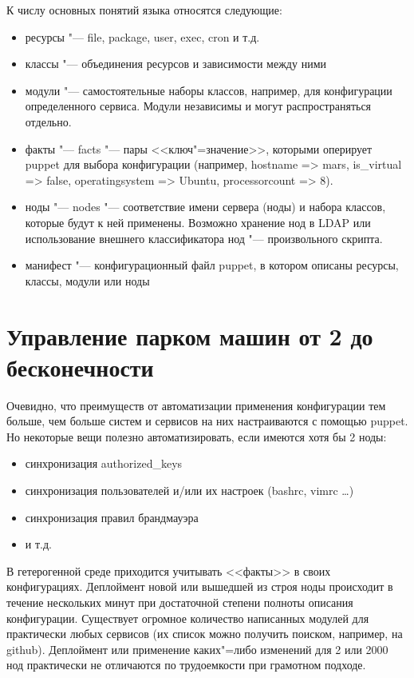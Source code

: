 \documentclass[10pt, a5paper]{article}
\begin{document}
К числу основных понятий языка относятся следующие:

\begin{itemize}
  \item ресурсы "--- file, package, user, exec, cron и т.д.
  \item классы "--- объединения ресурсов и зависимости между ними
  \item модули "--- самостоятельные наборы классов, например, для конфигурации определенного сервиса. Модули независимы и могут распространяться отдельно.
  \item факты "--- facts "--- пары <<ключ"=значение>>, которыми оперирует puppet для выбора конфигурации (например, hostname =\textgreater{} mars, is\_virtual =\textgreater{} false, operatingsystem =\textgreater{} Ubuntu, processorcount =\textgreater{} 8).
  \item ноды "--- nodes "--- соответствие имени сервера (ноды) и набора классов, которые будут к ней применены. Возможно хранение нод в LDAP или использование внешнего классификатора нод "--- произвольного скрипта.
  \item манифест "--- конфигурационный файл puppet, в котором описаны ресурсы, классы, модули или ноды
\end{itemize}

\section*{Управление парком машин от 2 до бесконечности}

Очевидно, что преимуществ от автоматизации применения конфигурации тем больше, чем больше систем и сервисов на них настраиваются с помощью puppet. Но некоторые вещи полезно автоматизировать, если имеются хотя бы 2 ноды:

\begin{itemize}
  \item синхронизация authorized\_keys
  \item синхронизация пользователей и/или их настроек (bashrc, vimrc \ldots{})
  \item синхронизация правил брандмауэра
  \item и т.д.
\end{itemize}

В гетерогенной среде приходится учитывать <<факты>> в своих конфигурациях. Деплоймент новой или вышедшей из строя ноды происходит в течение нескольких минут при достаточной степени полноты описания конфигурации. Существует огромное количество написанных модулей для практически любых сервисов (их список можно получить поиском, например, на github). Деплоймент или применение каких"=либо изменений для 2 или 2000 нод практически не отличаются по трудоемкости при грамотном подходе.
\end{document}
